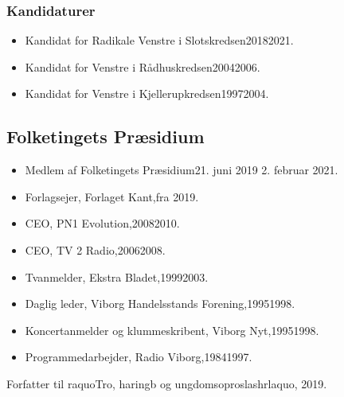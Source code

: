 \documentclass[11pt, a4paper]{awesome-cv}
\begin{document}
\begin{cvletter}
\subsubsection*{Kandidaturer}
\begin{itemize}
\item Kandidat for Radikale Venstre i Slotskredsen20182021.
\item Kandidat for Venstre i Rådhuskredsen20042006.
\item Kandidat for Venstre i Kjellerupkredsen19972004.
\end{itemize}
\subsection*{Folketingets Præsidium}
\begin{itemize}
\item Medlem af Folketingets Præsidium21. juni 2019  2. februar 2021.
\end{itemize}
\begin{itemize}
\item Forlagsejer, Forlaget Kant,fra 2019.
\item CEO, PN1 Evolution,20082010.
\item CEO, TV 2 Radio,20062008.
\item Tvanmelder, Ekstra Bladet,19992003.
\item Daglig leder, Viborg Handelsstands Forening,19951998.
\item Koncertanmelder og klummeskribent, Viborg Nyt,19951998.
\item Programmedarbejder, Radio Viborg,19841997.
\end{itemize}
Forfatter til raquoTro, haringb og ungdomsoproslashrlaquo, 2019.

\end{cvletter}
\end{document}
